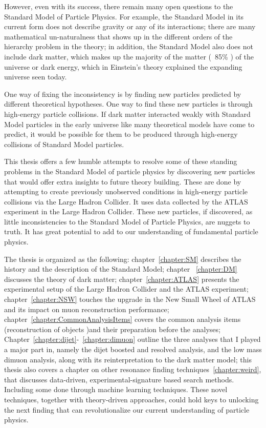 However, even with its success, there remain many open questions to the Standard Model of Particle Physics. %
For example, the Standard Model in its current form does not describe gravity or any of its interactions; there are many mathematical un-naturalness that shows up in the different orders of the hierarchy problem in the theory; in addition, the
Standard Model also does not include dark matter, which makes up the majority of the matter (~85\% ) of the universe or dark energy, which in 
Einstein's theory explained the expanding universe seen today.  

One way of fixing the inconsistency is by finding new particles predicted by different theoretical hypotheses. One way to find these new particles  is through high-energy particle collisions. If dark matter interacted weakly with Standard Model particles in the early universe like many theoretical models have come to predict, it would be possible for them to be produced through high-energy collisions of Standard Model particles.

This thesis offers a few humble attempts to resolve some of these standing problems in the Standard Model of particle physics by discovering new particles that would offer extra insights to future theory building. These are done by attempting to create previously unobserved conditions in high-energy particle collisions via the Large Hadron Collider. It uses data collected by the ATLAS experiment in the Large Hadron Collider. These new particles, if discovered, as little inconsistencies to the Standard Model of Particle
Physics, are nuggets to truth. It has great potential to add to our understanding of fundamental particle physics.

The thesis is organized as the following: chapter~\ref{chapter:SM} describes the history and the description of the Standard Model; chapter ~\ref{chapter:DM} discusses the theory of dark matter; chapter~\ref{chapter:ATLAS} presents the experimental setup of the Large Hadron Collider and the ATLAS experiment; chapter~\ref{chapter:NSW} touches the upgrade in the New Small Wheel of ATLAS and its impact on muon reconstruction performance;
chapter~\ref{chapter:CommonAnalysisItems} covers the common analysis items (reconstruction
of objects )and their preparation before the analyses; Chapter~\ref{chapter:dijet}-~\ref{chapter:dimuon} outline the three analyses that I played a major part in, namely the dijet boosted and resolved analysis, and the low mass dimuon analysis, along with its reinterpretation to the dark matter model; this thesis also covers a chapter on other resonance finding techniques~\ref{chapter:weird},  that discusses data-driven, experimental-signature based search methods. Including some done through machine learning techniques. 
These novel techniques, together with theory-driven approaches, could hold keys to unlocking the next finding that can revolutionalize our current understanding of particle physics. 


